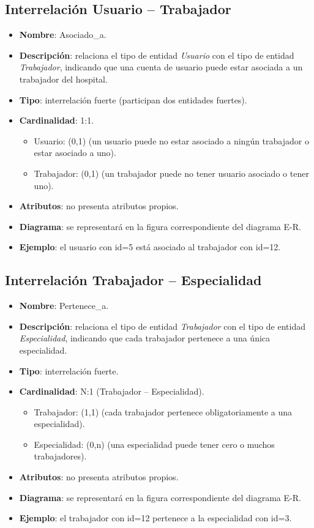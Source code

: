 \subsection{Interrelación Usuario -- Trabajador}
\begin{itemize}
    \item \textbf{Nombre}: Asociado\_a.
    \item \textbf{Descripción}: relaciona el tipo de entidad \textit{Usuario} con el tipo de entidad \textit{Trabajador},
    indicando que una cuenta de usuario puede estar asociada a un trabajador del hospital.
    \item \textbf{Tipo}: interrelación fuerte (participan dos entidades fuertes).
    \item \textbf{Cardinalidad}: 1:1.
    \begin{itemize}
        \item Usuario: (0,1) (un usuario puede no estar asociado a ningún trabajador o estar asociado a uno).
        \item Trabajador: (0,1) (un trabajador puede no tener usuario asociado o tener uno).
    \end{itemize}
    \item \textbf{Atributos}: no presenta atributos propios.
    \item \textbf{Diagrama}: se representará en la figura correspondiente del diagrama E-R.
    \item \textbf{Ejemplo}: el usuario con id=5 está asociado al trabajador con id=12.
\end{itemize}

\subsection{Interrelación Trabajador -- Especialidad}
\begin{itemize}
    \item \textbf{Nombre}: Pertenece\_a.
    \item \textbf{Descripción}: relaciona el tipo de entidad \textit{Trabajador} con el tipo de entidad \textit{Especialidad},
    indicando que cada trabajador pertenece a una única especialidad.
    \item \textbf{Tipo}: interrelación fuerte.
    \item \textbf{Cardinalidad}: N:1 (Trabajador -- Especialidad).
    \begin{itemize}
        \item Trabajador: (1,1) (cada trabajador pertenece obligatoriamente a una especialidad).
        \item Especialidad: (0,n) (una especialidad puede tener cero o muchos trabajadores).
    \end{itemize}
    \item \textbf{Atributos}: no presenta atributos propios.
    \item \textbf{Diagrama}: se representará en la figura correspondiente del diagrama E-R.
    \item \textbf{Ejemplo}: el trabajador con id=12 pertenece a la especialidad con id=3.
\end{itemize}

